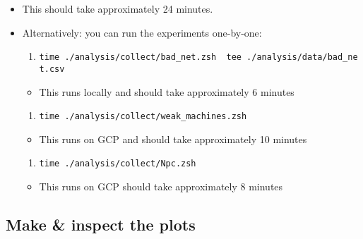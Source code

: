 \begin{itemize}
\tightlist
\item
  This should take approximately 24 minutes.
\item
  Alternatively: you can run the experiments one-by-one:

  \begin{enumerate}
  \def\labelenumi{\arabic{enumi}.}
  \tightlist
  \item
    \texttt{time\ ./analysis/collect/bad\_net.zsh\ \textbar{}\ tee\ ./analysis/data/bad\_net.csv}
  \end{enumerate}

  \begin{itemize}
  \tightlist
  \item
    This runs locally and should take approximately 6 minutes
  \end{itemize}

  \begin{enumerate}
  \def\labelenumi{\arabic{enumi}.}
  \setcounter{enumi}{1}
  \tightlist
  \item
    \texttt{time\ ./analysis/collect/weak\_machines.zsh}
  \end{enumerate}

  \begin{itemize}
  \tightlist
  \item
    This runs on GCP and should take approximately 10 minutes
  \end{itemize}

  \begin{enumerate}
  \def\labelenumi{\arabic{enumi}.}
  \setcounter{enumi}{2}
  \tightlist
  \item
    \texttt{time\ ./analysis/collect/Npc.zsh}
  \end{enumerate}

  \begin{itemize}
  \tightlist
  \item
    This runs on GCP should take approximately 8 minutes
  \end{itemize}
\end{itemize}

\hypertarget{make-inspect-the-plots}{%
\subsection{Make \& inspect the plots}\label{make-inspect-the-plots}}

